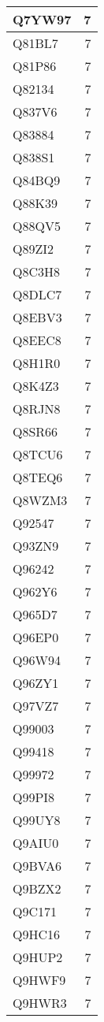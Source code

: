 \documentclass[
]{book}
\theoremstyle{definition}
\theoremstyle{definition}
\theoremstyle{definition}
\theoremstyle{definition}
\theoremstyle{remark}
\begin{document}
\begin{table}
\begin{tabular}{l|r}
\hline
Q7YW97 & 7\\
\hline
Q81BL7 & 7\\
\hline
Q81P86 & 7\\
\hline
Q82134 & 7\\
\hline
Q837V6 & 7\\
\hline
Q83884 & 7\\
\hline
Q838S1 & 7\\
\hline
Q84BQ9 & 7\\
\hline
Q88K39 & 7\\
\hline
Q88QV5 & 7\\
\hline
Q89ZI2 & 7\\
\hline
Q8C3H8 & 7\\
\hline
Q8DLC7 & 7\\
\hline
Q8EBV3 & 7\\
\hline
Q8EEC8 & 7\\
\hline
Q8H1R0 & 7\\
\hline
Q8K4Z3 & 7\\
\hline
Q8RJN8 & 7\\
\hline
Q8SR66 & 7\\
\hline
Q8TCU6 & 7\\
\hline
Q8TEQ6 & 7\\
\hline
Q8WZM3 & 7\\
\hline
Q92547 & 7\\
\hline
Q93ZN9 & 7\\
\hline
Q96242 & 7\\
\hline
Q962Y6 & 7\\
\hline
Q965D7 & 7\\
\hline
Q96EP0 & 7\\
\hline
Q96W94 & 7\\
\hline
Q96ZY1 & 7\\
\hline
Q97VZ7 & 7\\
\hline
Q99003 & 7\\
\hline
Q99418 & 7\\
\hline
Q99972 & 7\\
\hline
Q99PI8 & 7\\
\hline
Q99UY8 & 7\\
\hline
Q9AIU0 & 7\\
\hline
Q9BVA6 & 7\\
\hline
Q9BZX2 & 7\\
\hline
Q9C171 & 7\\
\hline
Q9HC16 & 7\\
\hline
Q9HUP2 & 7\\
\hline
Q9HWF9 & 7\\
\hline
Q9HWR3 & 7\\

\end{tabular}
\end{table}
\end{document}
